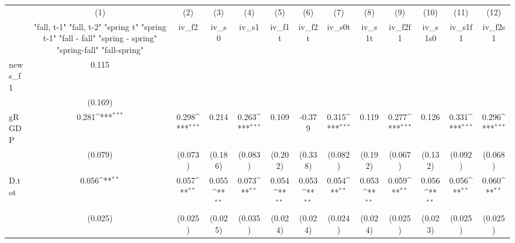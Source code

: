 {
\def\sym#1{\ifmmode^{#1}\else\(^{#1}\)\fi}
\begin{tabular}{l*{12}{c}}
\toprule
            &\multicolumn{1}{c}{(1)}&\multicolumn{1}{c}{(2)}&\multicolumn{1}{c}{(3)}&\multicolumn{1}{c}{(4)}&\multicolumn{1}{c}{(5)}&\multicolumn{1}{c}{(6)}&\multicolumn{1}{c}{(7)}&\multicolumn{1}{c}{(8)}&\multicolumn{1}{c}{(9)}&\multicolumn{1}{c}{(10)}&\multicolumn{1}{c}{(11)}&\multicolumn{1}{c}{(12)}\\
            &\multicolumn{1}{c}{  "fall, t-1" "fall, t-2" "spring t" "spring t-1"  "fall - fall" "spring - spring" "spring-fall" "fall-spring" }&\multicolumn{1}{c}{iv\_f2}&\multicolumn{1}{c}{iv\_s0}&\multicolumn{1}{c}{iv\_s1}&\multicolumn{1}{c}{iv\_f1t}&\multicolumn{1}{c}{iv\_f2t}&\multicolumn{1}{c}{iv\_s0t}&\multicolumn{1}{c}{iv\_s1t}&\multicolumn{1}{c}{iv\_f2f1}&\multicolumn{1}{c}{iv\_s1s0}&\multicolumn{1}{c}{iv\_s1f1}&\multicolumn{1}{c}{iv\_f2s1}\\
\midrule
news\_f1     &       0.115         &                     &                     &                     &                     &                     &                     &                     &                     &                     &                     &                     \\
            &     (0.169)         &                     &                     &                     &                     &                     &                     &                     &                     &                     &                     &                     \\
\addlinespace
gRGDP       &       0.281\sym{***}&       0.298\sym{***}&       0.214         &       0.263\sym{***}&       0.109         &      -0.379         &       0.315\sym{***}&       0.119         &       0.277\sym{***}&       0.126         &       0.331\sym{***}&       0.296\sym{***}\\
            &     (0.079)         &     (0.073)         &     (0.186)         &     (0.083)         &     (0.202)         &     (0.338)         &     (0.082)         &     (0.192)         &     (0.067)         &     (0.132)         &     (0.092)         &     (0.068)         \\
\addlinespace
D.tot       &       0.056\sym{**} &       0.057\sym{**} &       0.055\sym{**} &       0.073\sym{**} &       0.054\sym{**} &       0.053\sym{**} &       0.054\sym{**} &       0.053\sym{**} &       0.059\sym{**} &       0.056\sym{**} &       0.056\sym{**} &       0.060\sym{**} \\
            &     (0.025)         &     (0.025)         &     (0.025)         &     (0.035)         &     (0.024)         &     (0.024)         &     (0.024)         &     (0.024)         &     (0.025)         &     (0.023)         &     (0.025)         &     (0.025)         \\

\end{tabular}}
